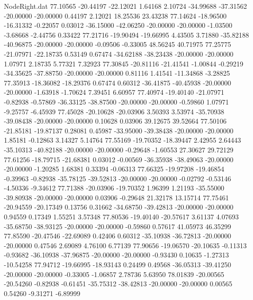 \begin{filecontents}{NodeRight.dat}
  77.10565  -20.44197  -22.12021     1.64168    2.10724  -34.99688  -37.31562  -20.00000  -20.00000    0.44197    2.12021   18.25536   23.43238
  77.14624  -18.96500  -16.31332    -0.22057    0.03012  -36.15000  -42.06250  -20.00000  -20.00000   -1.03500   -3.68668   -2.44756    0.33422
  77.21716  -19.90494  -19.66995     4.43505    3.71880  -35.82188  -40.96875  -20.00000  -20.00000   -0.09506   -0.33005   48.56245   40.71975
  77.25775  -21.07971  -22.18735     0.53149    0.67474  -34.62188  -38.23438  -20.00000  -20.00000    1.07971    2.18735    5.77321    7.32923
  77.30845  -20.81116  -21.41541    -1.00844   -0.29219  -34.35625  -37.88750  -20.00000  -20.00000    0.81116    1.41541  -11.34868   -3.28825
  77.35913  -18.36082  -18.29376     0.67474    0.60312  -36.41875  -40.45938  -20.00000  -20.00000   -1.63918   -1.70624    7.39451    6.60957
  77.40974  -19.40140  -21.07971    -0.82938   -0.57869  -36.33125  -38.87500  -20.00000  -20.00000   -0.59860    1.07971   -9.25757   -6.45939
  77.45028  -20.10628  -20.03906     3.50393    3.53974  -35.70938  -39.08438  -20.00000  -20.00000    0.10628    0.03906   39.12675   39.52664
  77.50106  -21.85181  -19.87137     0.28081    0.45987  -33.95000  -39.38438  -20.00000  -20.00000    1.85181   -0.12863    3.14327    5.14764
  77.55169  -19.70352  -18.39447     2.42955    2.64443  -35.10313  -40.82188  -20.00000  -20.00000   -0.29648   -1.60553   27.30627   29.72129
  77.61256  -18.79715  -21.68381     0.03012   -0.00569  -36.35938  -38.49063  -20.00000  -20.00000   -1.20285    1.68381    0.33394   -0.06313
  77.66325  -19.97208  -19.46854    -0.39963   -0.82938  -35.78125  -39.52813  -20.00000  -20.00000   -0.02792   -0.53146   -4.50336   -9.34612
  77.71388  -20.03906  -19.70352     1.96399    1.21193  -35.55000  -39.80938  -20.00000  -20.00000    0.03906   -0.29648   21.32178   13.15714
  77.75461  -20.94559  -20.17349     0.13756    0.31662  -34.68750  -39.42813  -20.00000  -20.00000    0.94559    0.17349    1.55251    3.57348
  77.80536  -19.40140  -20.57617     3.61137    4.07693  -35.68750  -38.93125  -20.00000  -20.00000   -0.59860    0.57617   41.05973   46.35299
  77.85590  -20.47546  -22.69089     0.42406    0.60312  -35.10938  -36.72813  -20.00000  -20.00000    0.47546    2.69089    4.76100    6.77139
  77.90656  -19.06570  -20.10635    -0.11313   -0.93682  -36.10938  -37.96875  -20.00000  -20.00000   -0.93430    0.10635   -1.27313  -10.54258
  77.94712  -19.66995  -18.93143     0.24499    0.49568  -36.05313  -39.41250  -20.00000  -20.00000   -0.33005   -1.06857    2.78736    5.63950
  78.01839  -20.00565  -20.54260    -0.82938   -0.61451  -35.75312  -38.42813  -20.00000  -20.00000    0.00565    0.54260   -9.31271   -6.89999

\end{filecontents}
